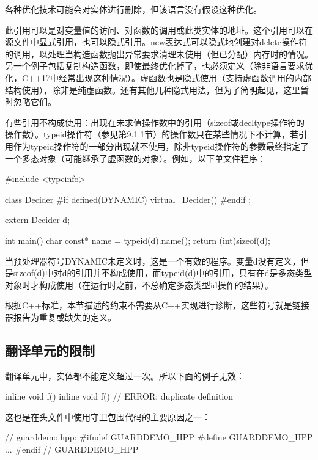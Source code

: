 \begin{notice}
各种优化技术可能会对实体进行删除，但该语言没有假设这种优化。
\end{notice}

此引用可以是对变量值的访问、对函数的调用或此类实体的地址。这个引用可以在源文件中显式引用，也可以隐式引用。new表达式可以隐式地创建对delete操作符的调用，以处理当构造函数抛出异常要求清理未使用（但已分配）内存时的情况。另一个例子包括复制构造函数，即使最终优化掉了，也必须定义（除非语言要求优化，C++17中经常出现这种情况）。虚函数也是隐式使用（支持虚函数调用的内部结构使用），除非是纯虚函数。还有其他几种隐式用法，但为了简明起见，这里暂时忽略它们。

有些引用不构成使用：出现在未求值操作数中的引用（sizeof或decltype操作符的操作数）。typeid操作符（参见第9.1.1节）的操作数只在某些情况下不计算，若引用作为typeid操作符的一部分出现就不使用，除非typeid操作符的参数最终指定了一个多态对象（可能继承了虚函数的对象）。例如，以下单文件程序：

\begin{cpp}
#include <typeinfo>

class Decider {
	#if defined(DYNAMIC)
	virtual ~Decider() {
	}
	#endif
};

extern Decider d;

int main() {
	char const* name = typeid(d).name();
	return (int)sizeof(d);
}
\end{cpp}

当预处理器符号DYNAMIC未定义时，这是一个有效的程序。变量d没有定义，但是sizeof(d)中对d的引用并不构成使用，而typeid(d)中的引用，只有在d是多态类型对象时才构成使用（在运行时之前，不总确定多态类型id操作的结果）。

根据C++标准，本节描述的约束不需要从C++实现进行诊断，这些符号就是链接器报告为重复或缺失的定义。

\subsection{翻译单元的限制}

翻译单元中，实体都不能定义超过一次。所以下面的例子无效：

\begin{cpp}
inline void f() {}
inline void f() {} // ERROR: duplicate definition
\end{cpp}

这也是在头文件中使用守卫包围代码的主要原因之一：

\begin{cpp}
// guarddemo.hpp:
#ifndef GUARDDEMO_HPP
#define GUARDDEMO_HPP
...
#endif // GUARDDEMO_HPP
\end{cpp}

